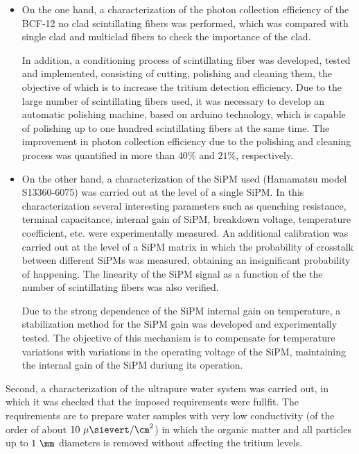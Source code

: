 \begin{itemize}

\item{} On the one hand, a characterization of the photon collection efficiency of the BCF-12 no clad scintillating fibers was performed, which was compared with single clad and multiclad fibers to check the importance of the clad. 

In addition, a conditioning process of scintillating fiber was developed, tested and implemented, consisting of cutting, polishing and cleaning them, the objective of which is to increase the tritium detection efficiency. Due to the large number of scintillating fibers used, it was necessary to develop an automatic polishing machine, based on arduino technology, which is capable of polishing up to one hundred scintillating fibers at the same time. The improvement in photon collection efficiency due to the polishing and cleaning process was quantified in more than $40\%$ and $21\%$, respectively. 

\item{} On the other hand, a characterization of the SiPM used (Hamamatsu model S13360-6075) was carried out at the level of a single SiPM. In this characterization several interesting parameters such as quenching resistance, terminal capacitance, internal gain of SiPM, breakdown voltage, temperature coefficient, etc. were experimentally measured. An additional calibration was carried out at the level of a SiPM matrix in which the probability of crosstalk between different SiPMs was measured, obtaining an insignificant probability of happening. The linearity of the SiPM signal as a function of the the number of scintillating fibers was also verified.

Due to the strong dependence of the SiPM internal gain on temperature, a stabilization method for the SiPM gain was developed and experimentally tested. The objective of this mechanism is to compensate for temperature variations with variations in the operating voltage of the SiPM, maintaining the internal gain of the SiPM duriung its operation.

\end{itemize}

Second, a characterization of the ultrapure water system was carried out, in which it was checked that the imposed requirements were fullfit. The requirements are to prepare water samples with very low conductivity (of the order of about $10~\mu\sievert/\cm^2$) in which the organic matter and all particles up to $1~\mm$ diameters is removed without affecting the tritium levels.

